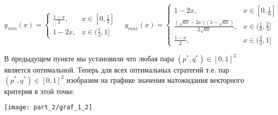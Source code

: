 $$y_{min}(x)=
\begin{cases}
\frac{1-x}{2}, &x\in[0,\frac{1}{3}] \\
1-2x, &x\in(\frac{1}{3},1]
\end{cases}
\quad
y_{max}(x)=
\begin{cases}
1-2x, &x\in[0,\frac{1}{6}] \\
\frac{(\sqrt{6x} - 2x)(3-\sqrt{6x})}{2\sqrt{6x}}, &x\in(\frac{1}{6},\frac{2}{3}]\\
\frac{1-x}{2}, &x\in(\frac{2}{3},1]
\end{cases}
$$

В предыдущем пункте мы установили что любая пара $(p^{*}, q^{*}) \in [0, 1]^{2}$ является оптимальной. Теперь для всех
оптимальных стратегий т.е. пар $(p^{*}, q^{*}) \in [0, 1]^{2}$ изобразим на графике значения матожидания векторного критерия в этой
точке.
\begin{center}
\texttt{[image: part\_2/graf\_1\_2]}
\end{center}

